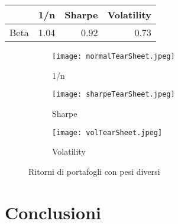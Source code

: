 \documentclass{report}
\begin{document}
\begin{tabular}{lrrr}
\toprule
{} &     1/n &     Sharpe &      Volatility \\
\midrule
Beta &  1.04 &  0.92 &  0.73 \\

\bottomrule
\end{tabular}

\begin{figure}[h]

\begin{subfigure}{0.5\textwidth}
\texttt{[image: normalTearSheet.jpeg]} 
\caption{1/n}
\label{fig:subim1}
\end{subfigure}
\begin{subfigure}{0.5\textwidth}
\texttt{[image: sharpeTearSheet.jpeg]}
\caption{Sharpe}
\label{fig:subim2}
\end{subfigure}
\begin{subfigure}{0.5\textwidth}
\texttt{[image: volTearSheet.jpeg]}
\caption{Volatility}
\label{fig:subim3}
\end{subfigure}

\caption{Ritorni di portafogli con pesi diversi}
\label{fig:image2}
\end{figure}

\chapter{Conclusioni}
\tableofcontents
\end{document}
